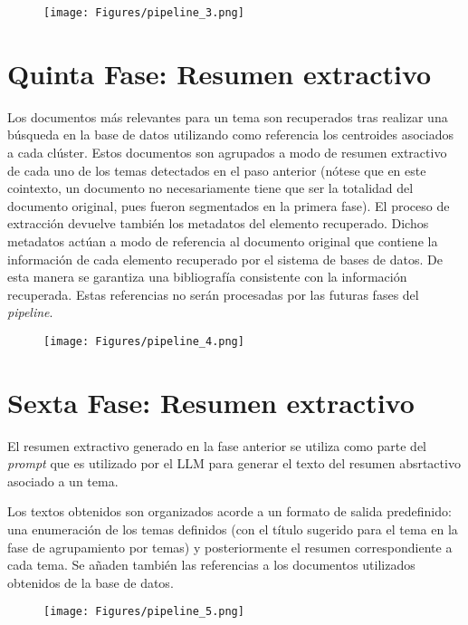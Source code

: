     \begin{figure}[H]    
        \centering
        \texttt{[image: Figures/pipeline\_3.png]}
        \caption*{}
    \end{figure}

    \section{Quinta Fase: Resumen extractivo} 
    Los documentos más relevantes para un tema son recuperados tras realizar una búsqueda en la base de datos utilizando como referencia los centroides asociados a cada clúster. Estos documentos son agrupados a modo de resumen extractivo de cada uno de los temas detectados en el paso anterior (nótese que en este cointexto, un documento no necesariamente tiene que ser la totalidad del documento original, pues fueron segmentados en la primera fase). El proceso de extracción devuelve también los metadatos del elemento recuperado. Dichos metadatos actúan a modo de referencia al documento original que contiene la información de cada elemento recuperado por el sistema de bases de datos. De esta manera se garantiza una bibliografía consistente con la información recuperada. Estas referencias no serán procesadas por las futuras fases del \emph{pipeline}.
    
    \begin{figure}[H]    
        \centering
        \texttt{[image: Figures/pipeline\_4.png]}
        \caption*{}
    \end{figure}

    \section{Sexta Fase: Resumen extractivo}
    El resumen extractivo generado en la fase anterior se utiliza como parte del \emph{prompt} que es utilizado por el LLM para generar el texto del resumen absrtactivo asociado a un tema.

    Los textos obtenidos son organizados acorde a un formato de salida predefinido: una enumeración de los temas definidos (con el título sugerido para el tema en la fase de agrupamiento por temas) y posteriormente el resumen correspondiente a cada tema. Se añaden también las referencias a los documentos utilizados obtenidos de la base de datos.

    \begin{figure}[H]    
        \centering
        \texttt{[image: Figures/pipeline\_5.png]}
        \caption*{}
    \end{figure}
